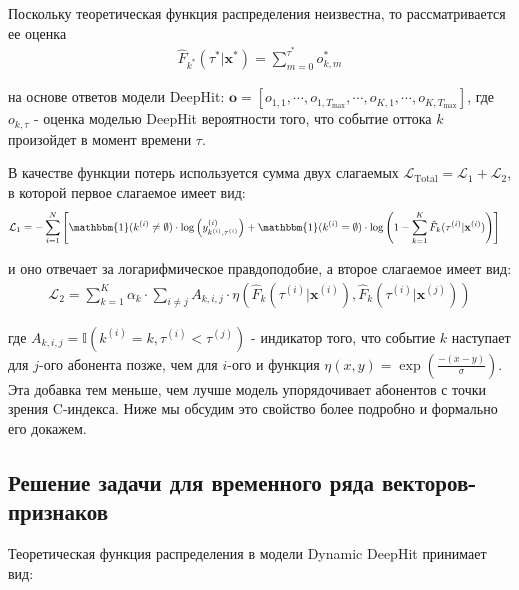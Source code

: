 \documentclass{article}
\begin{document}
Поскольку теоретическая функция распределения неизвестна, то рассматривается ее оценка 
\begin{equation}
	\begin{aligned}
		\hat{F}_{k^*}(\tau^*|\mathbf{x}^*)=\sum_{m=0}^{\tau^*}o_{k,m}^*
	\end{aligned}
\end{equation}

на основе ответов модели DeepHit: $\mathbf{o}=[o_{1,1},\cdots,o_{1,T_{\max}},\cdots,o_{K,1},\cdots,o_{K,T_{\max}}]$, где $o_{k,\tau}$ - оценка моделью DeepHit вероятности того, что событие оттока $k$ произойдет в момент времени $\tau$.

В качестве функции потерь используется сумма двух слагаемых $\mathcal{L}_{\mathrm{Total}}=\mathcal{L}_1+\mathcal{L}_2$, в которой первое слагаемое имеет вид: 
\begin{equation}
	\begin{aligned}
		\mathcal{L}_{1} & = -\sum_{i=1}^N \left[\mathbbm{1}(k^{(i)}\neq\emptyset)\cdot\log\left(y_{k^{(i)},\tau^{(i)}}^{(i)}\right)  + \mathbbm{1}(k^{(i)}=\emptyset)\cdot\log\left(1-\sum_{k=1}^K\hat{F}_k(\tau^{(i)}|\mathbf{x}^{(i)})\right)\right]
	\end{aligned}
\end{equation}

и оно отвечает за логарифмическое правдоподобие, а второе слагаемое имеет вид: 
\begin{equation}
	\begin{aligned}
		\mathcal{L}_2=\sum_{k=1}^K\alpha_k\cdot\sum_{i\neq j}A_{k,i,j}\cdot\eta\left(\hat{F}_k(\tau^{(i)}|\mathbf{x}^{(i)}),\hat{F}_k(\tau^{(i)}|\mathbf{x}^{(j)})\right)
	\end{aligned}
\end{equation}

где $A_{k,i,j} = \mathbb{I}(k^{(i)}=k,\tau^{(i)}<\tau^{(j)})$ - индикатор того, что событие $k$ наступает для $j$-ого абонента позже, чем для $i$-ого и функция
$\eta(x,y)=\exp\left(\frac{-(x-y)}{\sigma}\right)$. Эта добавка тем меньше, чем лучше модель упорядочивает абонентов с точки зрения C-индекса. Ниже мы обсудим это свойство более подробно и формально его докажем. 

\subsection{Решение задачи для временного ряда векторов-признаков}

Теоретическая функция распределения в модели Dynamic DeepHit принимает вид:
\end{document}

